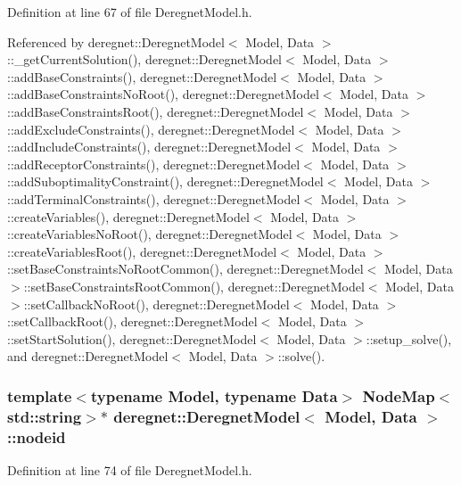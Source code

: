 Definition at line 67 of file Deregnet\+Model.\+h.



Referenced by deregnet\+::\+Deregnet\+Model$<$ Model, Data $>$\+::\+\_\+get\+Current\+Solution(), deregnet\+::\+Deregnet\+Model$<$ Model, Data $>$\+::add\+Base\+Constraints(), deregnet\+::\+Deregnet\+Model$<$ Model, Data $>$\+::add\+Base\+Constraints\+No\+Root(), deregnet\+::\+Deregnet\+Model$<$ Model, Data $>$\+::add\+Base\+Constraints\+Root(), deregnet\+::\+Deregnet\+Model$<$ Model, Data $>$\+::add\+Exclude\+Constraints(), deregnet\+::\+Deregnet\+Model$<$ Model, Data $>$\+::add\+Include\+Constraints(), deregnet\+::\+Deregnet\+Model$<$ Model, Data $>$\+::add\+Receptor\+Constraints(), deregnet\+::\+Deregnet\+Model$<$ Model, Data $>$\+::add\+Suboptimality\+Constraint(), deregnet\+::\+Deregnet\+Model$<$ Model, Data $>$\+::add\+Terminal\+Constraints(), deregnet\+::\+Deregnet\+Model$<$ Model, Data $>$\+::create\+Variables(), deregnet\+::\+Deregnet\+Model$<$ Model, Data $>$\+::create\+Variables\+No\+Root(), deregnet\+::\+Deregnet\+Model$<$ Model, Data $>$\+::create\+Variables\+Root(), deregnet\+::\+Deregnet\+Model$<$ Model, Data $>$\+::set\+Base\+Constraints\+No\+Root\+Common(), deregnet\+::\+Deregnet\+Model$<$ Model, Data $>$\+::set\+Base\+Constraints\+Root\+Common(), deregnet\+::\+Deregnet\+Model$<$ Model, Data $>$\+::set\+Callback\+No\+Root(), deregnet\+::\+Deregnet\+Model$<$ Model, Data $>$\+::set\+Callback\+Root(), deregnet\+::\+Deregnet\+Model$<$ Model, Data $>$\+::set\+Start\+Solution(), deregnet\+::\+Deregnet\+Model$<$ Model, Data $>$\+::setup\+\_\+solve(), and deregnet\+::\+Deregnet\+Model$<$ Model, Data $>$\+::solve().

\subsubsection[{\texorpdfstring{nodeid}{nodeid}}]{\setlength{\rightskip}{0pt plus 5cm}template$<$typename Model, typename Data$>$ {\bf Node\+Map}$<$std\+::string$>$$\ast$ {\bf deregnet\+::\+Deregnet\+Model}$<$ Model, {\bf Data} $>$\+::nodeid\hspace{0.3cm}{\ttfamily [protected]}}\hypertarget{classderegnet_1_1DeregnetModel_adfebf6f9983c9ccc934469a79381fb78}{}\label{classderegnet_1_1DeregnetModel_adfebf6f9983c9ccc934469a79381fb78}


Definition at line 74 of file Deregnet\+Model.\+h.



